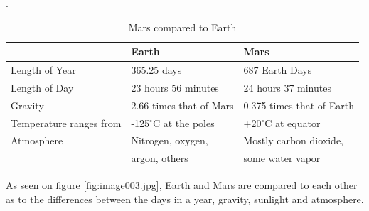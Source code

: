 .
\begin{table} [h]
    \centering
    \begin{tabu} to 1\textwidth { | X[c] X[c] X[c] | }
     \hline
      & Earth & Mars \\ 
     \hline
     Length of Year & 365.25 days & 687 Earth Days \\
     \hline
     Length of Day & 23 hours 56 minutes & 24 hours 37 minutes \\
     \hline
     Gravity & 2.66 times that of Mars & 0.375 times that of Earth \\
     \hline
     Temperature ranges from & -125$^{\circ}$C at the poles & +20$^{\circ}$C at equator \\
     \hline
     Atmosphere & Nitrogen, oxygen, & Mostly carbon dioxide, \\
      & argon, others & some water vapor \\
     \hline
    \end{tabu}
    \caption{Mars compared to Earth\cite{MarsVSEarth}}
    \label{tab:marsEarthFacts}
\end{table}



As seen on figure \ref{fig:image003.jpg}, Earth and Mars are compared to each other as to the differences between the days in a year, gravity, sunlight and atmosphere. 

